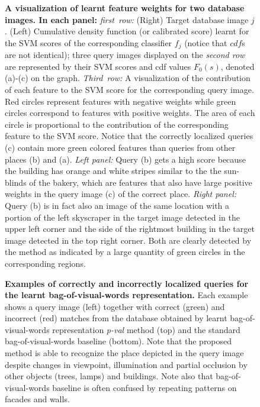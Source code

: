   \begin{figure}[tbp]
    
    \vspace*{-2mm}
    \caption{
          {\bf  A visualization of learnt feature weights for two database images. In each panel:} 
         \emph{first~row:} (Right) Target database image $j$. (Left) Cumulative density function (or calibrated score) learnt for the SVM scores of the corresponding classifier $f_j$ \textcolor{petr}{(notice that $cdf$s are not identical)};  three query images displayed on the \emph{second row} are represented by their SVM scores and cdf values $F_0(s)$, denoted (a)-(c) on the graph. \emph{Third~row:} A visualization of the contribution of each feature to the SVM score for the corresponding query image. Red circles represent features with negative weights while green circles correspond to features with positive weights. The area of each circle is proportional to the contribution of the corresponding feature to the SVM score.
         Notice that the correctly localized queries (c) contain more green colored features than queries from other places (b) and (a).
         {\it Left panel:} Query (b) gets a high score because the building has orange and white stripes similar to the the sun-blinds of the bakery, which are features that also have large positive weights in the query image (c) of the correct place.
         {\it Right panel:} Query (b) is in fact also an image of the same location with a portion of the left skyscraper in the target image detected in the upper left corner and the side of the rightmost building in the target image detected in the top right corner. Both are clearly detected by the method as indicated by a large quantity of green circles in the corresponding regions.
    }
    \label{fig:3qVSw}
    \vspace*{2mm}
  \end{figure}


    \begin{figure}[t!]
      
      \caption{
          \textbf{Examples  of correctly and incorrectly localized queries for the learnt bag-of-visual-words representation.}
          Each example shows a query image (left) together with correct (green) and incorrect (red) matches from the database obtained by learnt bag-of-visual-words representation \emph{p-val} method (top) and the standard bag-of-visual-words baseline (bottom). Note that the proposed method is able to recognize the place depicted in the query image despite changes in viewpoint, illumination and partial occlusion by other objects (trees, lamps) and buildings. Note also that bag-of-visual-words baseline is often confused by repeating patterns on facades and walls. 
      }
      \label{fig:images}
    \end{figure}




